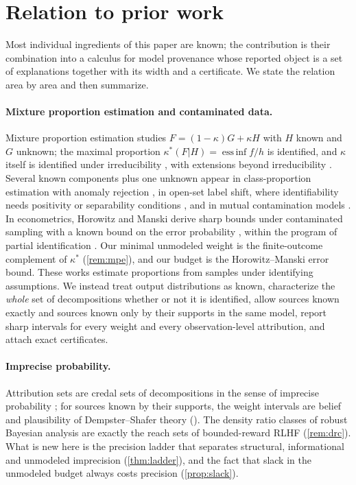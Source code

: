 \documentclass[11pt]{article}
\theoremstyle{definition}
\theoremstyle{remark}
\begin{document}
\section{Relation to prior work}\label{sec:related}

Most individual ingredients of this paper are known; the contribution is their combination into a
calculus for model provenance whose reported object is a set of explanations together with its width
and a certificate. We state the relation area by area and then summarize.

\paragraph{Mixture proportion estimation and contaminated data.} Mixture proportion estimation studies
$F=(1-\kappa)G+\kappa H$ with $H$ known and $G$ unknown; the maximal proportion
$\kappa^*(F|H)=\operatorname{ess\,inf}f/h$ is identified, and $\kappa$ itself is identified under
irreducibility \cite{Blanchard2010,Scott2015}, with extensions beyond irreducibility \cite{Zhu2023}.
Several known components plus one unknown appear in class-proportion estimation with anomaly rejection
\cite{SandersonScott2014}, in open-set label shift, where identifiability needs positivity or
separability conditions \cite{Garg2022}, and in mutual contamination models \cite{BlanchardScott2014}.
In econometrics, Horowitz and Manski derive sharp bounds under contaminated sampling with a known
bound on the error probability \cite{HorowitzManski1995}, within the program of partial
identification \cite{Manski2003}. Our minimal unmodeled weight is the finite-outcome complement of
$\kappa^*$ (\cref{rem:mpe}), and our budget is the Horowitz--Manski error bound. These works estimate
proportions from samples under identifying assumptions. We instead treat output distributions as
known, characterize the \emph{whole} set of decompositions whether or not it is identified, allow
sources known exactly and sources known only by their supports in the same model, report sharp
intervals for every weight and every observation-level attribution, and attach exact certificates.

\paragraph{Imprecise probability.} Attribution sets are credal sets of decompositions in the sense of
imprecise probability \cite{Walley1991}; for sources known by their supports, the weight intervals are
belief and plausibility of Dempster--Shafer theory \cite{Dempster1967,Shafer1976}
(\cite[Prop.~5.8]{Awasthi-Tower}). The density ratio classes of robust Bayesian analysis
\cite{DeRobertisHartigan1981} are exactly the reach sets of bounded-reward RLHF (\cref{rem:drc}). What
is new here is the precision ladder that separates structural, informational and unmodeled
imprecision (\cref{thm:ladder}), and the fact that slack in the unmodeled budget always costs precision
(\cref{prop:slack}).
\end{document}
